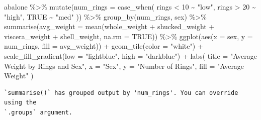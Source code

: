\documentclass[
  letterpaper,
  DIV=11,
  numbers=noendperiod]{scrartcl}
\newenvironment{Shaded}{\begin{snugshade}}{\end{snugshade}}
\newcommand{\AttributeTok}[1]{\textcolor[rgb]{0.40,0.45,0.13}{#1}}
\newcommand{\ConstantTok}[1]{\textcolor[rgb]{0.56,0.35,0.01}{#1}}
\newcommand{\DecValTok}[1]{\textcolor[rgb]{0.68,0.00,0.00}{#1}}
\newcommand{\FunctionTok}[1]{\textcolor[rgb]{0.28,0.35,0.67}{#1}}
\newcommand{\NormalTok}[1]{\textcolor[rgb]{0.00,0.23,0.31}{#1}}
\newcommand{\SpecialCharTok}[1]{\textcolor[rgb]{0.37,0.37,0.37}{#1}}
\newcommand{\StringTok}[1]{\textcolor[rgb]{0.13,0.47,0.30}{#1}}
\begin{document}
\begin{Shaded}
\begin{Highlighting}[]
\NormalTok{abalone }\SpecialCharTok{\%\textgreater{}\%}
  \FunctionTok{mutate}\NormalTok{(}\AttributeTok{num\_rings =} \FunctionTok{case\_when}\NormalTok{(}
\NormalTok{    rings }\SpecialCharTok{\textless{}} \DecValTok{10} \SpecialCharTok{\textasciitilde{}} \StringTok{"low"}\NormalTok{,}
\NormalTok{    rings }\SpecialCharTok{\textgreater{}} \DecValTok{20} \SpecialCharTok{\textasciitilde{}} \StringTok{"high"}\NormalTok{,}
    \ConstantTok{TRUE} \SpecialCharTok{\textasciitilde{}} \StringTok{"med"}
\NormalTok{  )) }\SpecialCharTok{\%\textgreater{}\%}
  \FunctionTok{group\_by}\NormalTok{(num\_rings, sex) }\SpecialCharTok{\%\textgreater{}\%}
  \FunctionTok{summarise}\NormalTok{(}\AttributeTok{avg\_weight =} \FunctionTok{mean}\NormalTok{(whole\_weight }\SpecialCharTok{+}\NormalTok{ shucked\_weight }\SpecialCharTok{+}\NormalTok{ viscera\_weight }\SpecialCharTok{+}\NormalTok{ shell\_weight, }\AttributeTok{na.rm =} \ConstantTok{TRUE}\NormalTok{)) }\SpecialCharTok{\%\textgreater{}\%}
  \FunctionTok{ggplot}\NormalTok{(}\FunctionTok{aes}\NormalTok{(}\AttributeTok{x =}\NormalTok{ sex, }\AttributeTok{y =}\NormalTok{ num\_rings, }\AttributeTok{fill =}\NormalTok{ avg\_weight)) }\SpecialCharTok{+}
  \FunctionTok{geom\_tile}\NormalTok{(}\AttributeTok{color =} \StringTok{"white"}\NormalTok{) }\SpecialCharTok{+}
  \FunctionTok{scale\_fill\_gradient}\NormalTok{(}\AttributeTok{low =} \StringTok{"lightblue"}\NormalTok{, }\AttributeTok{high =} \StringTok{"darkblue"}\NormalTok{) }\SpecialCharTok{+}
  \FunctionTok{labs}\NormalTok{(}
    \AttributeTok{title =} \StringTok{"Average Weight by Rings and Sex"}\NormalTok{,}
    \AttributeTok{x =} \StringTok{"Sex"}\NormalTok{,}
    \AttributeTok{y =} \StringTok{"Number of Rings"}\NormalTok{,}
    \AttributeTok{fill =} \StringTok{"Average Weight"}
\NormalTok{  )}
\end{Highlighting}
\end{Shaded}

\begin{verbatim}
`summarise()` has grouped output by 'num_rings'. You can override using the
`.groups` argument.
\end{verbatim}
\end{document}
